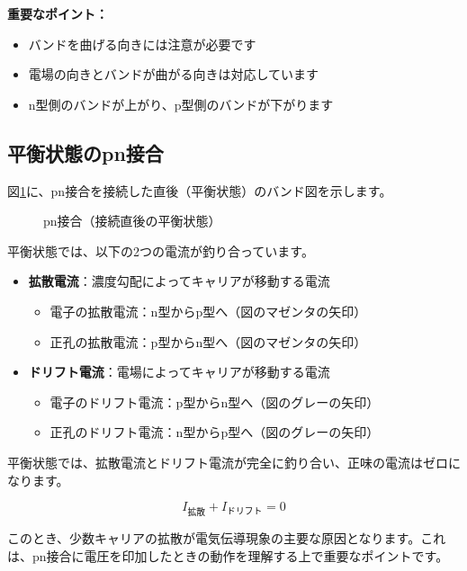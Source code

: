\textbf{重要なポイント：}
\begin{itemize}
\item バンドを曲げる向きには注意が必要です
\item 電場の向きとバンドが曲がる向きは対応しています
\item n型側のバンドが上がり、p型側のバンドが下がります
\end{itemize}

\subsection{平衡状態のpn接合}

図\ref{fig:pn_junction_initial}に、pn接合を接続した直後（平衡状態）のバンド図を示します。

\begin{figure}[H]
\centering
{}
\caption{pn接合（接続直後の平衡状態）}
\label{fig:pn_junction_initial}
\end{figure}

平衡状態では、以下の2つの電流が釣り合っています。

\begin{itemize}
\item \textbf{拡散電流}：濃度勾配によってキャリアが移動する電流
\begin{itemize}
\item 電子の拡散電流：n型からp型へ（図のマゼンタの矢印）
\item 正孔の拡散電流：p型からn型へ（図のマゼンタの矢印）
\end{itemize}

\item \textbf{ドリフト電流}：電場によってキャリアが移動する電流
\begin{itemize}
\item 電子のドリフト電流：p型からn型へ（図のグレーの矢印）
\item 正孔のドリフト電流：n型からp型へ（図のグレーの矢印）
\end{itemize}
\end{itemize}

平衡状態では、拡散電流とドリフト電流が完全に釣り合い、正味の電流はゼロになります。

\begin{equation}
I_{\text{拡散}} + I_{\text{ドリフト}} = 0
\end{equation}

このとき、少数キャリアの拡散が電気伝導現象の主要な原因となります。これは、pn接合に電圧を印加したときの動作を理解する上で重要なポイントです。

